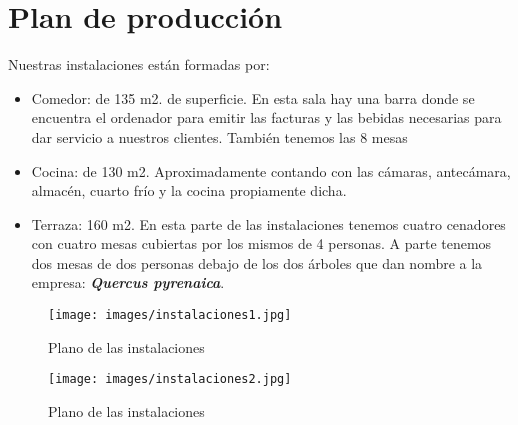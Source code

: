 \chapter{Plan de producción}
\label{chap:planProduccion}

Nuestras instalaciones están formadas por:

\begin{itemize}
\item Comedor: de 135 m2. de superficie. En esta sala hay una barra donde se encuentra el ordenador para emitir las facturas y las bebidas necesarias para dar servicio a nuestros clientes. También tenemos las 8 mesas 
\item Cocina: de 130 m2. Aproximadamente contando con las cámaras, antecámara, almacén, cuarto frío y la cocina propiamente dicha.
\item Terraza: 160 m2. En esta parte de las instalaciones tenemos cuatro cenadores con cuatro mesas cubiertas por los mismos de 4 personas. A parte tenemos dos mesas de dos personas debajo de los dos árboles que dan nombre a la empresa: \textbf{\textit{Quercus pyrenaica}}.
\end{itemize}

\begin{figure}[h]
  \begin{center}
    \texttt{[image: images/instalaciones1.jpg]}
    \caption{Plano de las instalaciones}
    \label{fig:instalaciones1}
  \end{center}
\end{figure}

\begin{figure}[ht]
  \begin{center}
    \texttt{[image: images/instalaciones2.jpg]}
    \caption{Plano de las instalaciones}
    \label{fig:instalaciones2}
  \end{center}
\end{figure}
